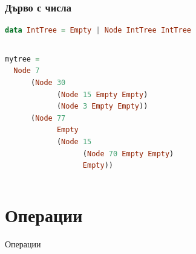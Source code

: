 \documentclass{beamer}
\begin{document}
\begin{frame}[fragile]
\frametitle{Дърво с числа}


    \begin{lstlisting}[basicstyle=\small,language=Haskell]
data IntTree = Empty | Node IntTree IntTree
    \end{lstlisting}

    
    \begin{columns}[t]
      \begin{column}{0.3\textwidth}

        \begin{lstlisting}[basicstyle=\tiny,language=Haskell]
mytree = 
  Node 7
      (Node 30 
            (Node 15 Empty Empty)
            (Node 3 Empty Empty))
      (Node 77
            Empty
            (Node 15
                  (Node 70 Empty Empty)
                  Empty))
        \end{lstlisting}
              
      \end{column}
      \begin{column}{0.7\textwidth}
        \begin{figure}
          \centering
        \end{figure}    
        
      \end{column}
    \end{columns}
    
    


\end{frame}


\section{Операции}
\begin{frame}
\centerline{Операции}
\end{frame}
\end{document}
